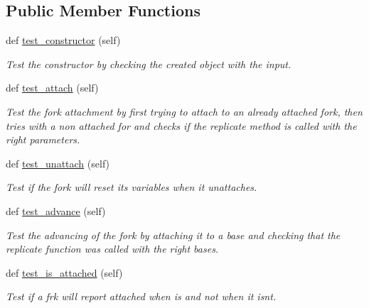 \subsection*{Public Member Functions}
\begin{DoxyCompactItemize}
\item 
def \mbox{\hyperlink{classReDyMo_1_1test_1_1test__replication__fork_1_1test__replication__fork_a56e666d191e78294a72a90804a4e70b0}{test\+\_\+constructor}} (self)
\begin{DoxyCompactList}\small\item\em Test the constructor by checking the created object with the input. \end{DoxyCompactList}\item 
def \mbox{\hyperlink{classReDyMo_1_1test_1_1test__replication__fork_1_1test__replication__fork_a318f9d99694530a49fd031659d016e20}{test\+\_\+attach}} (self)
\begin{DoxyCompactList}\small\item\em Test the fork attachment by first trying to attach to an already attached fork, then tries with a non attached for and checks if the replicate method is called with the right parameters. \end{DoxyCompactList}\item 
def \mbox{\hyperlink{classReDyMo_1_1test_1_1test__replication__fork_1_1test__replication__fork_a47ebd7572d932a0ac473c2c4e3b67d43}{test\+\_\+unattach}} (self)
\begin{DoxyCompactList}\small\item\em Test if the fork will reset its variables when it unattaches. \end{DoxyCompactList}\item 
def \mbox{\hyperlink{classReDyMo_1_1test_1_1test__replication__fork_1_1test__replication__fork_a29b0f8fb24e51bb7de864e4fee8da905}{test\+\_\+advance}} (self)
\begin{DoxyCompactList}\small\item\em Test the advancing of the fork by attaching it to a base and checking that the replicate function was called with the right bases. \end{DoxyCompactList}\item 
def \mbox{\hyperlink{classReDyMo_1_1test_1_1test__replication__fork_1_1test__replication__fork_a187dd908541c4bf18642ca5891f05564}{test\+\_\+is\+\_\+attached}} (self)
\begin{DoxyCompactList}\small\item\em Test if a frk will report attached when is and not when it isn\textquotesingle{}t. \end{DoxyCompactList}\end{DoxyCompactItemize}


